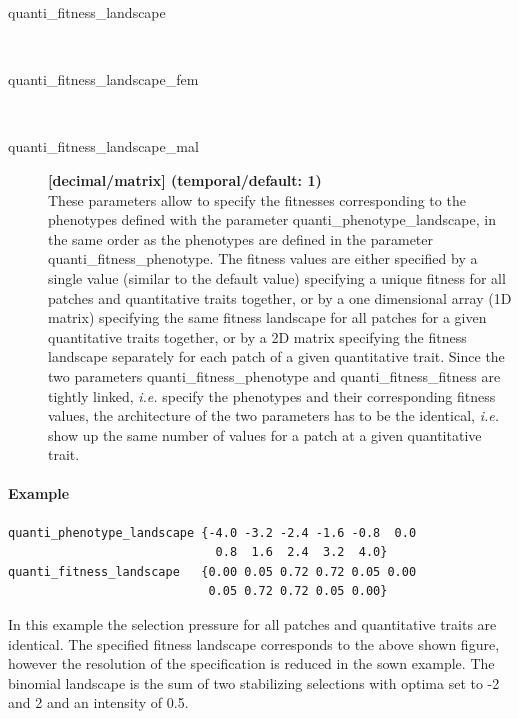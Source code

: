 \documentclass[letterpaper,12pt,oneside]{book}
\begin{document}
\begin{description}
\item[quanti\_fitness\_landscape]\hspace*{\fill}\\
\vspace{-9mm}
\item[quanti\_fitness\_landscape\_fem]\hspace*{\fill}\\
\vspace{-9mm}
\item[quanti\_fitness\_landscape\_mal]\textbf{[decimal/matrix] (temporal/default: 1)}\\
These parameters allow to specify the fitnesses corresponding to the phenotypes defined with the parameter \textsf{quanti\_phenotype\_landscape}, in the same order as the phenotypes are defined in the parameter \textsf{quanti\_fitness\_phenotype}. The fitness values are either specified by a single value (similar to the default value) specifying a unique fitness for all patches and quantitative traits together, or by a one dimensional array (1D matrix) specifying the same fitness landscape for all patches for a given quantitative traits together, or by a 2D matrix specifying the fitness landscape separately for each patch of a given quantitative trait. Since the two parameters \textsf{quanti\_fitness\_phenotype} and \textsf{quanti\_fitness\_fitness} are tightly linked, \textit{i.e.} specify the phenotypes and their corresponding fitness values, the architecture of the two parameters has to be the identical, \textit{i.e.} show up the same number of values for a patch at a given quantitative trait.  
\end{description}

\paragraph{Example}\hspace*{\fill}
\begin{lstlisting}[frame=single]
quanti_phenotype_landscape {-4.0 -3.2 -2.4 -1.6 -0.8  0.0  
                             0.8  1.6  2.4  3.2  4.0}
quanti_fitness_landscape   {0.00 0.05 0.72 0.72 0.05 0.00 
                            0.05 0.72 0.72 0.05 0.00}	
\end{lstlisting}
In this example the selection pressure for all patches and quantitative traits are identical. The specified fitness landscape corresponds to the above shown figure, however the resolution of the specification is reduced in the sown example. The binomial landscape is the sum of two stabilizing selections with optima set to -2 and 2 and an intensity of 0.5. 
\end{document}
